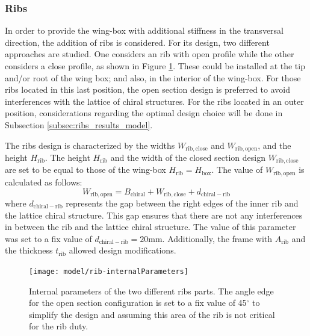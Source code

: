     \clearpage
    \subsubsection{Ribs} \label{subsubsec:Ribs_Parametrization}

    In order to provide the wing-box with additional stiffness in the transversal direction, the addition of ribs is considered. For its design, two different approaches are studied. One considers an rib with open profile while the other considers a close profile, as shown in Figure \ref{fig:rib-internalParameters}. These could be installed at the tip and/or root of the wing box; and also, in the interior of the wing-box. For those ribs located in this last position, the open section design is preferred to avoid interferences with the lattice of chiral structures. For the ribs located in an outer position, considerations regarding the optimal design choice will be done in Subsection \ref{subsec:ribs_results_model}.

    The ribs design is characterized by the widths $W_{\mathrm{rib,close}}$ and $W_{\mathrm{rib,open}}$, and the height $H_{\mathrm{rib}}$. The height $H_{\mathrm{rib}}$ and the width of the closed section design $W_{\mathrm{rib,close}}$ are set to be equal to those of the wing-box $H_{\mathrm{rib}} = H_{\mathrm{box}}$. The value of $W_{\mathrm{rib,open}}$ is calculated as follows:
    \begin{equation*}
    W_{\mathrm{rib,open}} = B_{\mathrm{chiral}} + W_{\mathrm{rib,close}} + d_{\mathrm{chiral-rib}}
    \end{equation*}
    where $d_{\mathrm{chiral-rib}}$ represents the gap between the right edges of the inner rib and the lattice chiral structure. This gap ensures that there are not any interferences in between the rib and the lattice chiral structure. The value of this parameter was set to a fix value of $d_{\mathrm{chiral-rib}} = 20$mm. Additionally, the frame with $A_{\mathrm{rib}}$ and the thickness $t_{\mathrm{rib}}$ allowed design modifications.

    \begin{figure}[!htpb]
      \centering
      \texttt{[image: model/rib-internalParameters]}
      \caption[Internal parameters of the two different ribs parts]{Internal parameters of the two different ribs parts. The angle edge for the open section configuration is set to a fix value of 45$^{\circ}$ to simplify the design and assuming this area of the rib is not critical for the rib duty. }\label{fig:rib-internalParameters}
    \end{figure}

